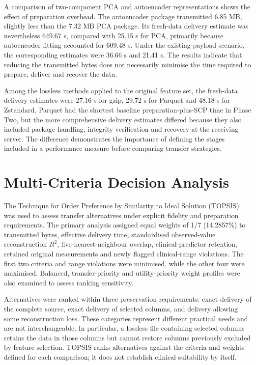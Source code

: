 A comparison of two-component PCA and autoencoder representations shows
the effect of preparation overhead. The autoencoder package transmitted
6.85 MB, slightly less than the 7.32 MB PCA package. Its fresh-data
delivery estimate was nevertheless 649.67 s, compared with 25.15 s for
PCA, primarily because autoencoder fitting accounted for 609.48 s. Under
the existing-payload scenario, the corresponding estimates were 36.66 s
and 21.41 s. The results indicate that reducing the transmitted bytes
does not necessarily minimise the time required to prepare, deliver and
recover the data.

Among the lossless methods applied to the original feature set, the
fresh-data delivery estimates were 27.16 s for gzip, 29.72 s for Parquet
and 48.18 s for Zstandard. Parquet had the shortest baseline
preparation-plus-SCP time in Phase Two, but the more comprehensive
delivery estimates differed because they also included package handling,
integrity verification and recovery at the receiving server. The
difference demonstrates the importance of defining the stages included
in a performance measure before comparing transfer strategies.

\section{Multi-Criteria Decision
	Analysis}\label{multi-criteria-decision-analysis}

The Technique for Order Preference by Similarity to Ideal Solution
(TOPSIS) was used to assess transfer alternatives under explicit
fidelity and preparation requirements. The primary analysis assigned
equal weights of 1/7 (14.2857\%) to transmitted bytes, effective
delivery time, standardised observed-value reconstruction \(R^2\),
five-nearest-neighbour overlap, clinical-predictor retention, retained
original measurements and newly flagged clinical-range violations. The
first two criteria and range violations were minimised, while the other
four were maximised. Balanced, transfer-priority and utility-priority
weight profiles were also examined to assess ranking sensitivity.

Alternatives were ranked within three preservation requirements: exact
delivery of the complete source, exact delivery of selected columns, and
delivery allowing some reconstruction loss. These categories represent
different practical needs and are not interchangeable. In particular, a
lossless file containing selected columns retains the data in those
columns but cannot restore columns previously excluded by feature
selection. TOPSIS ranks alternatives against the criteria and weights
defined for each comparison; it does not establish clinical suitability
by itself.

